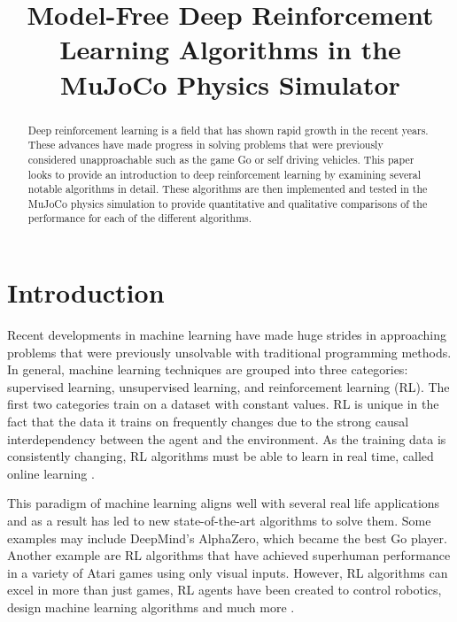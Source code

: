 \documentclass[conference]{IEEEtran}
\begin{document}
\title{Model-Free Deep Reinforcement Learning Algorithms in the MuJoCo Physics Simulator}

\author{
    \and
}
\maketitle

\begin{abstract}
    Deep reinforcement learning is a field that has shown rapid growth in the recent years. These advances have made progress in solving problems that were previously considered unapproachable such as the game Go or self driving vehicles. This paper looks to provide an introduction to deep reinforcement learning by examining several notable algorithms in detail. These algorithms are then implemented and tested in the MuJoCo physics simulation to provide quantitative and qualitative comparisons of the performance for each of the different algorithms.
\end{abstract}

\section{Introduction}

Recent developments in machine learning have made huge strides in approaching problems that were previously unsolvable with traditional programming methods. In general, machine learning techniques are grouped into three categories: supervised learning, unsupervised learning, and reinforcement learning (RL). The first two categories train on a dataset with constant values. RL is unique in the fact that the data it trains on frequently changes due to the strong causal interdependency between the agent and the environment. As the training data is consistently changing, RL algorithms must be able to learn in real time, called online learning \cite{rl_application}.

This paradigm of machine learning aligns well with several real life applications and as a result has led to new state-of-the-art algorithms to solve them.  Some examples may include DeepMind's AlphaZero, which became the best Go player. Another example are RL algorithms that have achieved superhuman performance in a variety of Atari games using only visual inputs. However, RL algorithms can excel in more than just games, RL agents have been created to control robotics, design machine learning algorithms and much more \cite{deep_rl_survey}.
\end{document}
